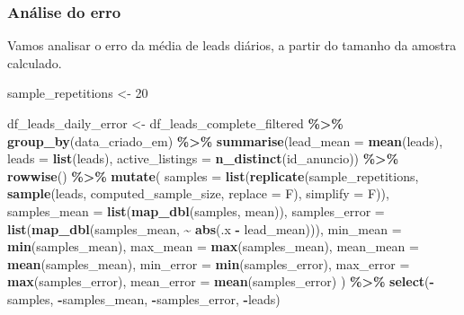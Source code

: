 \documentclass[
]{article}
\newenvironment{Shaded}{\begin{snugshade}}{\end{snugshade}}
\newcommand{\AttributeTok}[1]{\textcolor[rgb]{0.13,0.29,0.53}{#1}}
\newcommand{\DecValTok}[1]{\textcolor[rgb]{0.00,0.00,0.81}{#1}}
\newcommand{\FunctionTok}[1]{\textcolor[rgb]{0.13,0.29,0.53}{\textbf{#1}}}
\newcommand{\NormalTok}[1]{#1}
\newcommand{\OtherTok}[1]{\textcolor[rgb]{0.56,0.35,0.01}{#1}}
\newcommand{\SpecialCharTok}[1]{\textcolor[rgb]{0.81,0.36,0.00}{\textbf{#1}}}
\begin{document}
\subsubsection{Análise do erro}\label{anuxe1lise-do-erro}

Vamos analisar o erro da média de leads diários, a partir do tamanho da
amostra calculado.

\begin{Shaded}
\begin{Highlighting}[]
\NormalTok{sample\_repetitions }\OtherTok{\textless{}{-}} \DecValTok{20}

\NormalTok{df\_leads\_daily\_error }\OtherTok{\textless{}{-}}\NormalTok{ df\_leads\_complete\_filtered }\SpecialCharTok{\%\textgreater{}\%}
  \FunctionTok{group\_by}\NormalTok{(data\_criado\_em) }\SpecialCharTok{\%\textgreater{}\%}
  \FunctionTok{summarise}\NormalTok{(}\AttributeTok{lead\_mean =} \FunctionTok{mean}\NormalTok{(leads),}
            \AttributeTok{leads =} \FunctionTok{list}\NormalTok{(leads),}
            \AttributeTok{active\_listings =} \FunctionTok{n\_distinct}\NormalTok{(id\_anuncio)) }\SpecialCharTok{\%\textgreater{}\%}
  \FunctionTok{rowwise}\NormalTok{() }\SpecialCharTok{\%\textgreater{}\%}
  \FunctionTok{mutate}\NormalTok{(}
    \AttributeTok{samples =} \FunctionTok{list}\NormalTok{(}\FunctionTok{replicate}\NormalTok{(sample\_repetitions, }\FunctionTok{sample}\NormalTok{(leads, computed\_sample\_size, }\AttributeTok{replace =}\NormalTok{ F), }\AttributeTok{simplify =}\NormalTok{ F)),}
    \AttributeTok{samples\_mean =} \FunctionTok{list}\NormalTok{(}\FunctionTok{map\_dbl}\NormalTok{(samples, mean)),}
    \AttributeTok{samples\_error =} \FunctionTok{list}\NormalTok{(}\FunctionTok{map\_dbl}\NormalTok{(samples\_mean, }\SpecialCharTok{\textasciitilde{}} \FunctionTok{abs}\NormalTok{(.x }\SpecialCharTok{{-}}\NormalTok{ lead\_mean))),}
    \AttributeTok{min\_mean =} \FunctionTok{min}\NormalTok{(samples\_mean),}
    \AttributeTok{max\_mean =} \FunctionTok{max}\NormalTok{(samples\_mean),}
    \AttributeTok{mean\_mean =} \FunctionTok{mean}\NormalTok{(samples\_mean),}
    \AttributeTok{min\_error =} \FunctionTok{min}\NormalTok{(samples\_error),}
    \AttributeTok{max\_error =} \FunctionTok{max}\NormalTok{(samples\_error),}
    \AttributeTok{mean\_error =} \FunctionTok{mean}\NormalTok{(samples\_error)}
\NormalTok{  ) }\SpecialCharTok{\%\textgreater{}\%}
  \FunctionTok{select}\NormalTok{(}\SpecialCharTok{{-}}\NormalTok{samples, }\SpecialCharTok{{-}}\NormalTok{samples\_mean, }\SpecialCharTok{{-}}\NormalTok{samples\_error, }\SpecialCharTok{{-}}\NormalTok{leads)}


\end{Highlighting}
\end{Shaded}
\end{document}
